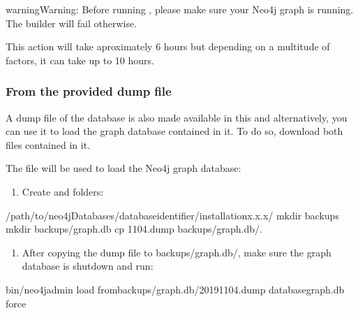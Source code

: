 \documentclass[letterpaper,10pt,english]{sphinxmanual}
\begin{document}
\begin{sphinxadmonition}{warning}{Warning:}
Before running , please make sure your Neo4j graph is running. The builder will fail otherwise.
\end{sphinxadmonition}

This action will take aproximately 6 hours but depending on a multitude of factors, it can take up to 10 hours.


\subsubsection{From the provided dump file }
\label{\detokenize{intro/getting-started-with-build:from-the-provided-dump-file-testing}}
A dump file of the database is also made available in this  and alternatively, you can use it to load the graph database contained in it. To do so, download both files contained in it.

The  file will be used to load the Neo4j graph database:
\begin{enumerate}
%
\item {} 
Create  and  folders:

\end{enumerate}

\begin{sphinxVerbatim}[commandchars=\\\{\}]
\PYGZdl{}  /path/to/neo4jDatabases/database\PYGZhy{}identifier/installation\PYGZhy{}x.x.x/
\PYGZdl{} mkdir backups
\PYGZdl{} mkdir backups/graph.db
\PYGZdl{} cp \PYGZhy{}11\PYGZhy{}04.dump backups/graph.db/.
\end{sphinxVerbatim}
\begin{enumerate}
%
\setcounter{enumi}{1}
\item {} 
After copying the dump file to backups/graph.db/, make sure the graph database is shutdown and run:

\end{enumerate}

\begin{sphinxVerbatim}[commandchars=\\\{\}]
\PYGZdl{} bin/neo4j\PYGZhy{}admin load \PYGZhy{}\PYGZhy{}frombackups/graph.db/2019\PYGZhy{}11\PYGZhy{}04.dump \PYGZhy{}\PYGZhy{}databasegraph.db \PYGZhy{}\PYGZhy{}force
\end{sphinxVerbatim}
\end{document}
